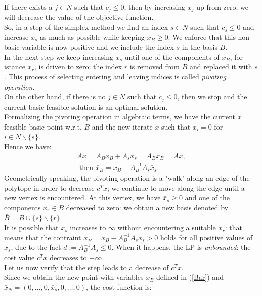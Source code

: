 \documentclass[a4paper,10 pt,titlepage,twoside]{book}
\theoremstyle{plain}
\theoremstyle{definition}
\theoremstyle{remark}
\begin{document}
 If there exists a $j \in N$ such that $\widetilde{c}_{j} \leq 0$, then by increasing $x_{j}$ up from zero, we will decrease the value of the objective function.\\
So, in a step of the simplex method we find an index $s \in N$ such that $\widetilde{c}_{s} \leq 0$ and increase $x_{s}$ as much as possible while keeping $x_{B} \geq 0$. We enforce that this non-basic variable is now positive and we include the index $s$ in the basis $B$.\\
In the next step we keep increasing $x_{s}$ until one of the components of $x_{B}$, for istance $x_{r}$, is driven to zero: the index $r$ is removed from $B$ and replaced it with $s$. This process of selecting entering and leaving indices is called \textit{pivoting operation}. \\
On the other hand, if there is no $j \in N$ such that $\widetilde{c}_{j} \leq 0$, then we stop and the current basic feasible solution is an optimal solution. \\
Formalizing the pivoting operation in algebraic terms, we have the current $x$ feasible basic point w.r.t. $B$ and the new iterate $\bar{x}$ such that $\bar{x}_{i} = 0$ for $i \in N\backslash\{s\}$.\\
Hence we have: 
\begin{align}
	A\bar{x} = A_{B}\bar{x}_{B} +A_{s}\bar{x}_{s} = A_{B}x_{B} = Ax,\\
	\text{  then }
	\bar{x}_{B} = x_{B} - A_{B}^{-1}A_{s}\bar{x}_{s}\label{Bar}.
\end{align}
Geometrically speaking, the pivoting operation is a "walk" along an edge of the polytope in order to decrease $c^{T}x$; we continue to move along the edge until a new vertex is encountered. At this vertex, we have $\bar{x}_{s}\geq0$ and one of the components $\bar{x}_{r}\in B$ decreased to zero: we obtain a new basis denoted by $\bar{B} = B \cup \{s\} \backslash \{r\}$.\\
It is possible that $x_{s}$ increases to $\infty$ without encountering a suitable $x_{r}$: that means that the contraint $\bar{x}_{\bar{B}} = x_{B} - A_{B}^{-1}A_{s}\bar{x}_{s}>0$ holds for all positive values of $\bar{x}_{s}$, due to the fact $d := A_{B}^{-1}A_{s}\leq0$. When it happens, the LP is \textit{unbounded}: the cost value $c^{T}x$ decreases to $-\infty$.\\[0.5cm]
Let us now verify that the step leads to a decrease of $c^{T}x$.\\
Since we obtain the new point with variables $\bar{x}_{B}$ defined in (\ref{Bar}) and $\bar{x}_{N}=(0,\dots, 0, \bar{x}_{s}, 0,\dots, 0)$, the cost function is:
\end{document}
